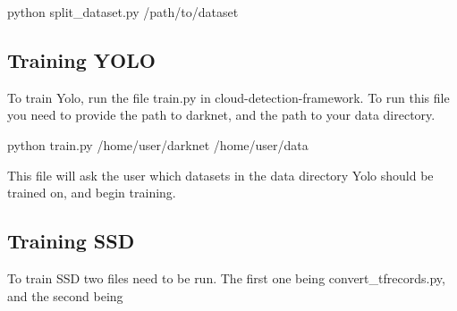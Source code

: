 \begin{lcverbatim}
python split_dataset.py /path/to/dataset
\end{lcverbatim}




\subsection{Training YOLO}
To train Yolo, run the file train.py in cloud-detection-framework. To run this file you need to provide the path to darknet, and the path to your data directory.

\begin{lcverbatim}
python train.py /home/user/darknet /home/user/data
\end{lcverbatim}

This file will ask the user which datasets in the data directory Yolo should be trained on, and begin training. 

\subsection{Training SSD}
To train SSD two files need to be run. The first one being convert\_tfrecords.py, and the second being